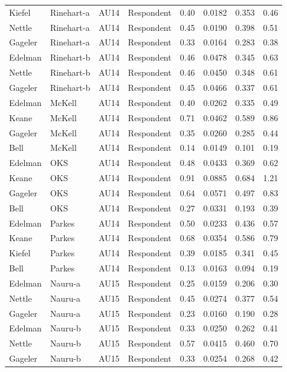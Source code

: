 \documentclass{monashthesis}
\begin{document}
\begin{center}
\begin{longtable}{llllllll}
Kiefel & Rinehart-a & AU14 & Respondent & 0.40 & 0.0182 & 0.353 & 0.46 \\
Nettle & Rinehart-a & AU14 & Respondent & 0.45 & 0.0190 & 0.398 & 0.51 \\
Gageler & Rinehart-a & AU14 & Respondent & 0.33 & 0.0164 & 0.283 & 0.38 \\
Edelman & Rinehart-b & AU14 & Respondent & 0.46 & 0.0478 & 0.345 & 0.63 \\
Nettle & Rinehart-b & AU14 & Respondent & 0.46 & 0.0450 & 0.348 & 0.61 \\
Gageler & Rinehart-b & AU14 & Respondent & 0.45 & 0.0466 & 0.337 & 0.61 \\
Edelman & McKell & AU14 & Respondent & 0.40 & 0.0262 & 0.335 & 0.49 \\
Keane & McKell & AU14 & Respondent & 0.71 & 0.0462 & 0.589 & 0.86 \\
Gageler & McKell & AU14 & Respondent & 0.35 & 0.0260 & 0.285 & 0.44 \\
Bell & McKell & AU14 & Respondent & 0.14 & 0.0149 & 0.101 & 0.19 \\
Edelman & OKS & AU14 & Respondent & 0.48 & 0.0433 & 0.369 & 0.62 \\
Keane & OKS & AU14 & Respondent & 0.91 & 0.0885 & 0.684 & 1.21 \\
Gageler & OKS & AU14 & Respondent & 0.64 & 0.0571 & 0.497 & 0.83 \\
Bell & OKS & AU14 & Respondent & 0.27 & 0.0331 & 0.193 & 0.39 \\
Edelman & Parkes & AU14 & Respondent & 0.50 & 0.0233 & 0.436 & 0.57 \\
Keane & Parkes & AU14 & Respondent & 0.68 & 0.0354 & 0.586 & 0.79 \\
Kiefel & Parkes & AU14 & Respondent & 0.39 & 0.0185 & 0.341 & 0.45 \\
Bell & Parkes & AU14 & Respondent & 0.13 & 0.0163 & 0.094 & 0.19 \\
Edelman & Nauru-a & AU15 & Respondent & 0.25 & 0.0159 & 0.206 & 0.30 \\
Nettle & Nauru-a & AU15 & Respondent & 0.45 & 0.0274 & 0.377 & 0.54 \\
Gageler & Nauru-a & AU15 & Respondent & 0.23 & 0.0160 & 0.190 & 0.28 \\
Edelman & Nauru-b & AU15 & Respondent & 0.33 & 0.0250 & 0.262 & 0.41 \\
Nettle & Nauru-b & AU15 & Respondent & 0.57 & 0.0415 & 0.460 & 0.70 \\
Gageler & Nauru-b & AU15 & Respondent & 0.33 & 0.0254 & 0.268 & 0.42 \\

\end{longtable}
\end{center}
\end{document}
